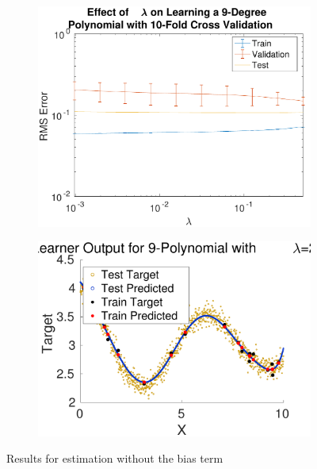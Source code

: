 \documentclass{report}
\begin{document}
\begin{figure}[h]
\centering
\begin{subfigure}[h]{ 0.5\linewidth}
\includegraphics [width=\linewidth ]{lambda_sweep_without_bias}
\end{subfigure}
\begin{subfigure}[h]{ 0.5\linewidth}
\includegraphics [width=\linewidth ]{without_bias_comparison}
\end{subfigure}
\label{fig:withoutbias}
\caption{Results for estimation without the bias term}
\end{figure}
\end{document}
